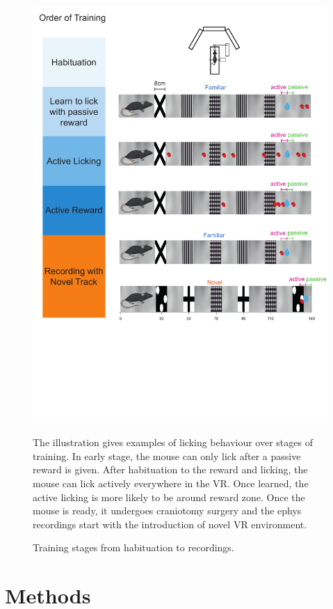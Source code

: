 \begin{figure}
    \centering
    \includegraphics[width=1\linewidth]{figures//Chapter 3 Behaviour//Thesis Figures//figure_PDFs/fig1_behaviour_training.pdf}
    \caption{Training stages from habituation to recordings. }
\medskip
\small
The illustration gives examples of licking behaviour over stages of training. In early stage, the mouse can only lick after a passive reward is given. After habituation to the reward and licking, the mouse can lick actively everywhere in the VR. Once learned, the active licking is more likely to be around reward zone. Once the mouse is ready, it undergoes craniotomy surgery and the ephys recordings start with the introduction of novel VR environment.
    \label{fig:overall training stages}
\end{figure}

\section{Methods}
